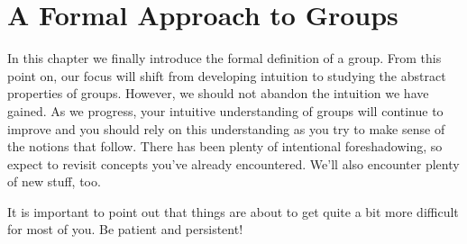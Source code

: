 \chapter{A Formal Approach to Groups}
\label{chapter:formal_groups}
\thispagestyle{empty}

In this chapter we finally introduce the formal definition of a group.  From this point on, our focus will shift from developing intuition to studying the abstract properties of groups.  However, we should not abandon the intuition we have gained.  As we progress, your intuitive understanding of groups will continue to improve and you should rely on this understanding as you try to make sense of the notions that follow.  There has been plenty of intentional foreshadowing, so expect to revisit concepts you've already encountered.  We'll also encounter plenty of new stuff, too.

It is important to point out that things are about to get quite a bit more difficult for most of you.  Be patient and persistent!

